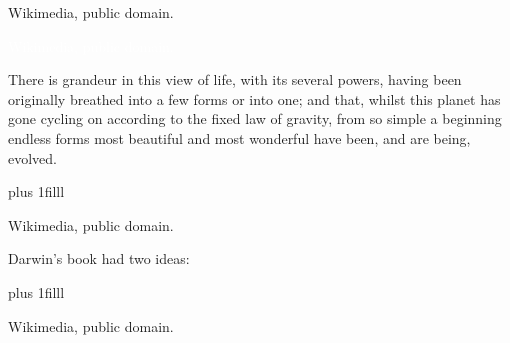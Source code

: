 \documentclass[t]{beamer}
\begin{document}
%
{
\begin{frame}[b]

	\hfill\tiny Wikimedia, public domain.
\end{frame}
}
%
{
\begin{frame}[plain]
\end{frame}
}
%
{
\begin{frame}[t]
\end{frame}
}
%
{
\begin{frame}[t]{}
\end{frame}
}
%
{
\begin{frame}[b]
\hfill\tiny\textcolor{white}{Wikimedia, public domain.}
\end{frame}
}


{
\begin{frame}[t]

	\vspace*{3\baselineskip}

	\hangpara\parbox[t]{2.25in}{\raggedright %
There is grandeur in this view of life, with its several powers, having been originally breathed into a few forms or into one; and that, whilst this planet has gone cycling on according to the fixed law of gravity, from so simple a beginning endless forms most beautiful and most wonderful have been, and are being, evolved.}

	\vskip0pt plus 1filll
	
	\hfill\tiny Wikimedia, public domain.
\end{frame}
}
%
{
\begin{frame}[t]

	\vspace*{3\baselineskip}
	
	\hangpara Darwin's book had two ideas:
	
	\hangpara\hspace*{1em} 
	
	\hangpara\hspace*{1em}

	\vskip0pt plus 1filll
	
	\hfill\tiny Wikimedia, public domain.
\end{frame}
}
\end{document}
